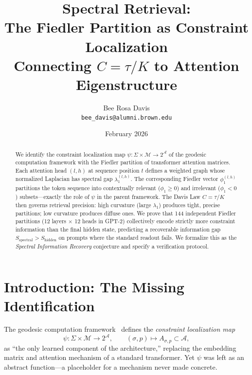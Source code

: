 \documentclass[11pt]{article}
\title{\textbf{Spectral Retrieval:}\\[0.25ex]
\textbf{The Fiedler Partition as Constraint Localization}\\[0.5ex]
\large Connecting $C = \tau/K$ to Attention Eigenstructure}
\author{Bee Rosa Davis\\
\small \texttt{bee\_davis@alumni.brown.edu}}
\date{February 2026}
\theoremstyle{remark}
\begin{document}
\maketitle

\begin{abstract}
We identify the constraint localization map 
$\psi : \Sigma \times \mathcal{M} \to 2^{\mathcal{A}}$ of the 
geodesic computation framework with the Fiedler partition of 
transformer attention matrices. Each attention head $(l,h)$ at 
sequence position $t$ defines a weighted graph whose normalized 
Laplacian has spectral gap $\lambda_1^{(l,h)}$. The corresponding 
Fiedler vector $\phi_1^{(l,h)}$ partitions the token sequence 
into contextually relevant ($\phi_1 \geq 0$) and irrelevant 
($\phi_1 < 0$) subsets---exactly the role of $\psi$ in the 
parent framework. The Davis Law $C = \tau/K$ then governs 
retrieval precision: high curvature (large $\lambda_1$) produces 
tight, precise partitions; low curvature produces diffuse ones. 
We prove that 144 independent Fiedler partitions (12 layers 
$\times$ 12 heads in GPT-2) collectively encode strictly more 
constraint information than the final hidden state, predicting 
a recoverable information gap $S_{\text{spectral}} > S_{\text{hidden}}$ 
on prompts where the standard readout fails. We formalize this 
as the \emph{Spectral Information Recovery} conjecture and 
specify a verification protocol.
\end{abstract}

\tableofcontents
\newpage

\section{Introduction: The Missing Identification}
\label{sec:intro}

The geodesic computation framework~\cite{davis2026geodesic} defines 
the \emph{constraint localization map}
\begin{equation}\label{eq:psi}
  \psi : \Sigma \times \mathcal{M} \to 2^{\mathcal{A}},
  \qquad (\sigma, p) \mapsto A_{\sigma,p} \subset \mathcal{A},
\end{equation}
as ``the only learned component of the architecture,'' replacing 
the embedding matrix and attention mechanism of a standard 
transformer. Yet $\psi$ was left as an abstract function---a 
placeholder for a mechanism never made concrete.
\end{document}
